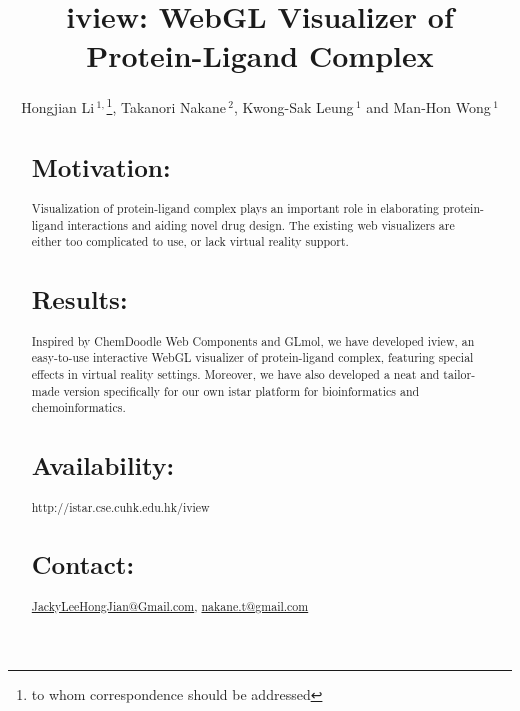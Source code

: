 \documentclass{bioinfo}
\begin{document}

\title[iview]{iview: WebGL Visualizer of Protein-Ligand Complex}
\author[Hongjian Li \textit{et~al}]{Hongjian Li\,$^{1,}$\footnote{to whom correspondence should be addressed}, Takanori Nakane\,$^{2}$, Kwong-Sak Leung\,$^{1}$ and Man-Hon Wong\,$^{1}$}
\address{$^{1}$Department of Computer Science and Engineering, Chinese University of Hong Kong, Hong Kong\\
$^{2}$Graduate School of Medicine, Kyoto University, Japan}



\maketitle

\begin{abstract}

\section{Motivation:}
Visualization of protein-ligand complex plays an important role in elaborating protein-ligand interactions and aiding novel drug design. The existing web visualizers are either too complicated to use, or lack virtual reality support.

\section{Results:}
Inspired by ChemDoodle Web Components and GLmol, we have developed iview, an easy-to-use interactive WebGL visualizer of protein-ligand complex, featuring special effects in virtual reality settings. Moreover, we have also developed a neat and tailor-made version specifically for our own istar platform for bioinformatics and chemoinformatics.

\section{Availability:}
http://istar.cse.cuhk.edu.hk/iview

\section{Contact:} \href{JackyLeeHongJian@Gmail.com}{JackyLeeHongJian@Gmail.com}, \href{nakane.t@gmail.com}{nakane.t@gmail.com}
\end{abstract}
\end{document}
